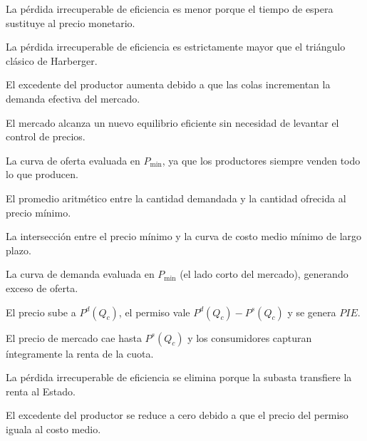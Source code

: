 \begin{opts}
    \item La pérdida irrecuperable de eficiencia es menor porque el tiempo de espera sustituye al precio monetario.
    \item La pérdida irrecuperable de eficiencia es estrictamente mayor que el triángulo clásico de Harberger.
    \item El excedente del productor aumenta debido a que las colas incrementan la demanda efectiva del mercado.
    \item El mercado alcanza un nuevo equilibrio eficiente sin necesidad de levantar el control de precios.
\end{opts}

\begin{opts}
    \item La curva de oferta evaluada en $P_{\min}$, ya que los productores siempre venden todo lo que producen.
    \item El promedio aritmético entre la cantidad demandada y la cantidad ofrecida al precio mínimo.
    \item La intersección entre el precio mínimo y la curva de costo medio mínimo de largo plazo.
    \item La curva de demanda evaluada en $P_{\min}$ (el lado corto del mercado), generando exceso de oferta.
\end{opts}

\begin{opts}
    \item El precio sube a $P^d(Q_c)$, el permiso vale $P^d(Q_c) - P^s(Q_c)$ y se genera $PIE$.
    \item El precio de mercado cae hasta $P^s(Q_c)$ y los consumidores capturan íntegramente la renta de la cuota.
    \item La pérdida irrecuperable de eficiencia se elimina porque la subasta transfiere la renta al Estado.
    \item El excedente del productor se reduce a cero debido a que el precio del permiso iguala al costo medio.
\end{opts}

